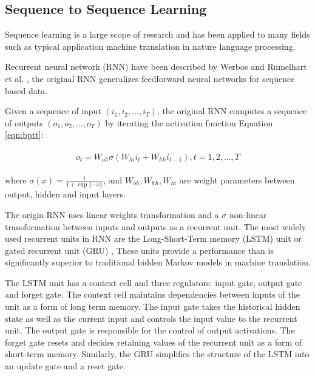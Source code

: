 \subsection{Sequence to Sequence Learning}
\label{sec:seq-learn}

Sequence learning is a large scope of research and has been applied to many fields such as 
typical application machine translation in nature language processing. 

Recurrent neural network (RNN) have been described by Werbos \cite{werbos1990rnn} and 
Rumelhart et al. \cite{Rumelhart:1988:LRB:65669.104451}, the original RNN 
generalizes feedforward neural networks for sequence based data.

Given a sequence of input $(i_1, i_2, ..., i_T)$, the original RNN computes a
sequence of outputs $(o_1, o_2, ..., o_T)$ 
by iterating the activation function Equation \ref{eqn:bptt}:

\begin{align}
\label{eqn:bptt}
\begin{split}
    o_t = W_{oh} \sigma \left( W_{hi}i_{t} + W_{hh}i_{t-1}\right), t=1,2,...,T
\end{split}
\end{align}

where $\sigma(x) = \frac{1}{1+\exp\{-x\}}$,
and $W_{oh}, W_{hh}, W_{hi}$ are weight parameters between output, hidden and input layers.

The origin RNN uses linear weights transformation and a $\sigma$ non-linear transformation between 
inputs and outputs as a recurrent unit. The most widely used recurrent units in RNN are the
Long-Short-Term memory (LSTM) unit \cite{hochreiter1997lstm} 
or gated recurrent unit (GRU) \cite{DBLP:journals/corr/ChoMGBSB14}, These units provide a
performance than is significantly superior to traditional hidden Markov models 
in machine translation\cite{DBLP:journals/corr/abs-1901-01122}.

The LSTM unit has a context cell and three regulators: input gate, 
output gate and forget gate.
The context cell maintains dependencies between inputs of the unit as a form of long term memory. 
The input gate takes the historical hidden state as well as the current input and controls 
the input value to the recurrent unit. The output gate is responsible for the control of output activations. 
The forget gate resets and decides retaining values of the recurrent unit as a form of short-term memory.
Similarly, the GRU simplifies the structure of the LSTM into an update gate and a reset gate.

